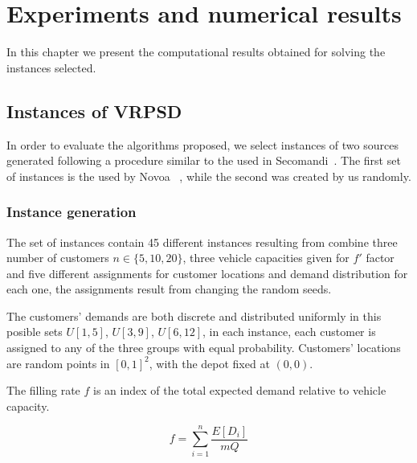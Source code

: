 \chapter{Experiments and numerical results}
\label{chap:results}

In this chapter we present the computational results obtained for solving the instances selected. 


\section{Instances of VRPSD}

In order to evaluate the algorithms proposed, we select instances of two sources generated following a procedure similar to the used in Secomandi~\cite{secomandi_comparing_2000}. The first set of instances is the used by Novoa ~\cite{novoa_approximate_2009}, while the second was created by us randomly.

\subsection{Instance generation}

The set of instances contain 45 different instances resulting from combine three number of customers $n \in \{5,10,20\}$, three vehicle capacities given for $f'$ factor and five different assignments for customer locations and demand distribution for each one, the assignments result from changing the random seeds.

The customers' demands are both discrete and distributed uniformly in this posible sets $U[1,5]$, $U[3,9]$, $U[6,12]$, in each instance, each customer is assigned to any of the three groups with equal probability. Customers' locations are random points in $[0, 1]^2$, with the depot fixed at $(0,0)$.%


The filling rate $f$ is an index of the total expected demand relative to vehicle capacity.

\begin{equation}\label{eq:4filling-rate}
f=\sum_{i=1}^n\frac{E[D_i]}{mQ}
\end{equation}

